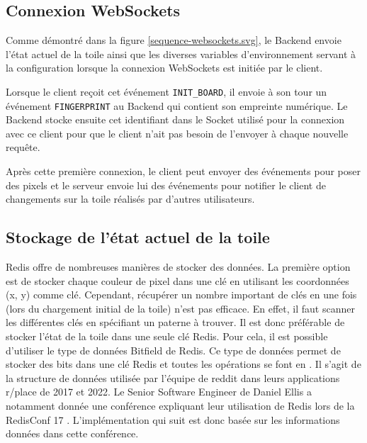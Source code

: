 \subsection{Connexion WebSockets}
\label{section:connexion-websockets}


Comme démontré dans la figure \ref{sequence-websockets.svg}, le Backend envoie l'état actuel de la toile ainsi que les diverses variables d'environnement servant à la configuration lorsque la connexion WebSockets est initiée par le client.

Lorsque le client reçoit cet événement \texttt{INIT\_BOARD}, il envoie à son tour un événement \texttt{FINGERPRINT} au Backend qui contient son empreinte numérique. Le Backend stocke ensuite cet identifiant dans le Socket utilisé pour la connexion avec ce client pour que le client n'ait pas besoin de l'envoyer à chaque nouvelle requête.

Après cette première connexion, le client peut envoyer des événements pour poser des pixels et le serveur envoie lui des événements pour notifier le client de changements sur la toile réalisés par d'autres utilisateurs.

\subsection{Stockage de l'état actuel de la toile}
\label{section:stockage}

Redis offre de nombreuses manières de stocker des données. La première option est de stocker chaque couleur de pixel dans une clé en utilisant les coordonnées (x, y) comme clé. Cependant, récupérer un nombre important de clés en une fois (lors du chargement initial de la toile) n'est pas efficace. En effet, il faut scanner les différentes clés en spécifiant un paterne à trouver. Il est donc préférable de stocker l'état de la toile dans une seule clé Redis. Pour cela, il est possible d'utiliser le type de données Bitfield \cite{bitfield} de Redis. Ce type de données permet de stocker des bits dans une clé Redis et toutes les opérations se font en . Il s'agit de la structure de données utilisée par l'équipe de \gls{reddit} dans leurs applications r/place de 2017 et 2022. Le Senior Software Engineer de Daniel Ellis a notamment donnée une conférence expliquant leur utilisation de Redis lors de la RedisConf 17 \cite{redisconf}. L'implémentation qui suit est donc basée sur les informations données dans cette conférence.

